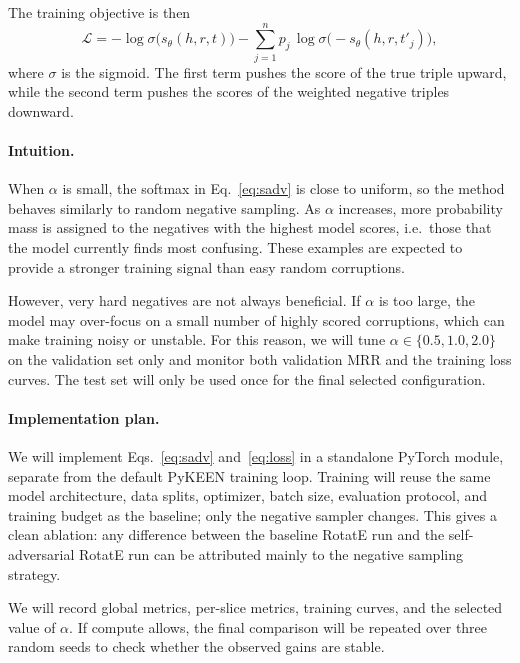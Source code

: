 \documentclass{llncs}
\begin{document}
The training objective is then
\begin{equation}
  \mathcal{L}
  =
  -\log\sigma\!\bigl(s_\theta(h,r,t)\bigr)
  -
  \sum_{j=1}^{n}
  p_j\,
  \log\sigma\!\bigl(-s_\theta(h,r,t'_j)\bigr),
  \label{eq:loss}
\end{equation}
where $\sigma$ is the sigmoid.
The first term pushes the score of the true triple upward, while the
second term pushes the scores of the weighted negative triples downward.

\paragraph{Intuition.}
When $\alpha$ is small, the softmax in Eq.~\eqref{eq:sadv} is close to
uniform, so the method behaves similarly to random negative sampling.
As $\alpha$ increases, more probability mass is assigned to the negatives
with the highest model scores, i.e.\ those that the model currently finds
most confusing.
These examples are expected to provide a stronger training signal than
easy random corruptions.

However, very hard negatives are not always beneficial.
If $\alpha$ is too large, the model may over-focus on a small number of
highly scored corruptions, which can make training noisy or unstable.
For this reason, we will tune $\alpha\in\{0.5,1.0,2.0\}$ on the
validation set only and monitor both validation MRR and the training loss
curves.
The test set will only be used once for the final selected configuration.

\paragraph{Implementation plan.}
We will implement Eqs.~\eqref{eq:sadv} and~\eqref{eq:loss} in a standalone
PyTorch module, separate from the default PyKEEN training loop.
Training will reuse the same model architecture, data splits, optimizer,
batch size, evaluation protocol, and training budget as the baseline;
only the negative sampler changes.
This gives a clean ablation: any difference between the baseline RotatE
run and the self-adversarial RotatE run can be attributed mainly to the
negative sampling strategy.

We will record global metrics, per-slice metrics, training curves, and the
selected value of $\alpha$.
If compute allows, the final comparison will be repeated over three random
seeds to check whether the observed gains are stable.
\end{document}
